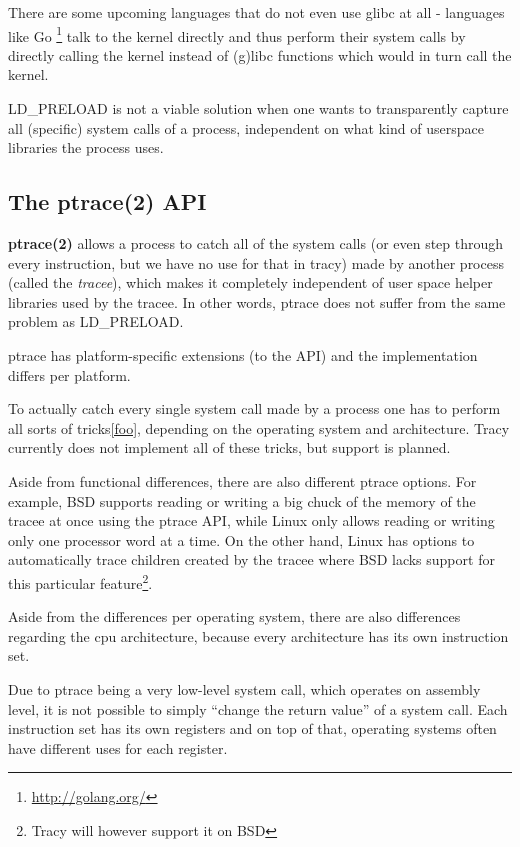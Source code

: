 \documentclass[a4paper, twoside, 10pt, twocolumn]{report}
\begin{document}
There are some upcoming languages that do not even use glibc at all - languages
like Go \footnote{\url{http://golang.org/}} talk to the kernel directly and
thus perform their system calls by directly calling the kernel instead of
(g)libc functions which would in turn call the kernel.

LD\_PRELOAD is not a viable solution when one wants to transparently capture
all (specific) system calls of a process, independent on what kind of
userspace libraries the process uses.

\subsection{The ptrace(2) API}

\textbf{ptrace(2)} allows a process to catch all of the system calls (or even
step through every instruction, but we have no use for that in tracy)
made by another process (called the \textit{tracee}), which makes it
completely independent of user space helper libraries used by the tracee.
In other words, ptrace does not suffer from the same problem as LD\_PRELOAD.

ptrace has platform-specific extensions (to the API) and the
implementation differs per platform.

To actually catch every single system call made by a process one has to
perform all sorts of tricks\ref{foo}, depending on the operating system and
architecture. Tracy currently does not implement all of these tricks, but
support is planned.

Aside from functional differences, there are also different ptrace options.
For example, BSD supports reading or writing a big chuck of the memory
of the tracee at once using the ptrace API, while Linux only allows
reading or writing only one processor word at a time.
On the other hand, Linux has options to automatically trace
children created by the tracee where BSD lacks support for
this particular feature\footnote{Tracy will however support it on BSD}.

Aside from the differences per operating system, there are also differences
regarding the cpu architecture, because every architecture has its own
instruction set.

Due to ptrace being a very low-level system call, which operates on assembly
level, it is not possible to simply ``change the return value'' of a system
call. Each instruction set has its own registers and on top of that, operating
systems often have different uses for each register.
\end{document}
